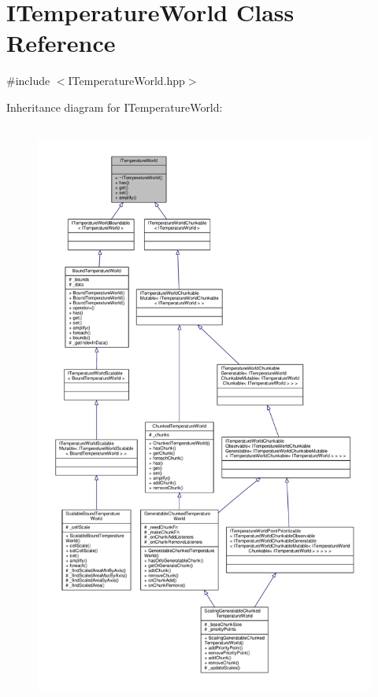\hypertarget{class_i_temperature_world}{\section{I\-Temperature\-World Class Reference}
\label{class_i_temperature_world}
}


{\ttfamily \#include $<$I\-Temperature\-World.\-hpp$>$}



Inheritance diagram for I\-Temperature\-World\-:
\nopagebreak
\begin{figure}[H]
\begin{center}
\leavevmode
\includegraphics[height=550pt]{class_i_temperature_world__inherit__graph}
\end{center}
\end{figure}


